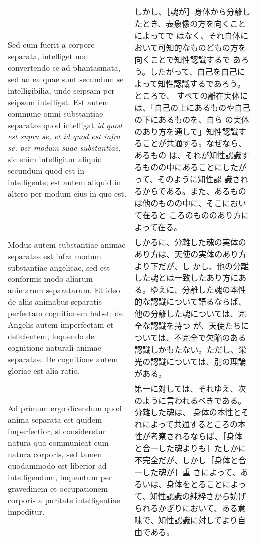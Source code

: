 \documentclass[10pt]{jsarticle} %
\begin{document}
\begin{longtable}{p{21em}p{21em}}
\\


Sed cum fuerit a corpore separata, intelliget non convertendo se ad
phantasmata, sed ad ea quae sunt secundum se intelligibilia, unde
seipsam per seipsam intelliget. Est autem commune omni substantiae
separatae quod intelligat {\it id quod est supra se, et id quod est
infra se, per modum suae substantiae}, sic enim intelligitur aliquid
secundum quod est in intelligente; est autem aliquid in altero per
modum eius in quo est.

&しかし、［魂が］身体から分離したとき、表象像の方を向くことによってで
はなく、それ自体において可知的なものどもの方を向くことで知性認識するで
あろう。したがって、自己を自己によって知性認識するであろう。ところで、
すべての離在実体には、「自己の上にあるものや自己の下にあるものを、自ら
の実体のあり方を通して」知性認識することが共通する。なぜなら、あるもの
は、それが知性認識するものの中にあることにしたがって、そのように知性認
識されるからである。また、あるものは他のものの中に、そこにおいて在ると
ころのもののあり方によって在る。
\\


Modus autem substantiae animae separatae est infra modum substantiae
angelicae, sed est conformis modo aliarum animarum separatarum. Et
ideo de aliis animabus separatis perfectam cognitionem habet; de
Angelis autem imperfectam et deficientem, loquendo de cognitione
naturali animae separatae. De cognitione autem gloriae est alia ratio.

&

しかるに、分離した魂の実体のあり方は、天使の実体のあり方より下だが、し
かし、他の分離した魂とは一致したあり方にある。ゆえに、分離した魂の本性
的な認識について語るならば、他の分離した魂については、完全な認識を持つ
が、天使たちについては、不完全で欠陥のある認識しかもたない。ただし、栄
光の認識については、別の理論がある。


\\



{\sc Ad primum ergo dicendum} quod anima separata est quidem
imperfectior, si consideretur natura qua communicat cum natura
corporis, sed tamen quodammodo est liberior ad intelligendum,
inquantum per gravedinem et occupationem corporis a puritate
intelligentiae impeditur.

&

第一に対しては、それゆえ、次のように言われるべきである。分離した魂は、
身体の本性とそれによって共通するところの本性が考察されるならば、［身体
と合一した魂よりも］たしかに不完全だが、しかし［身体と合一した魂が］重
さによって、あるいは、身体をとることによって、知性認識の純粋さから妨げ
られるかぎりにおいて、ある意味で、知性認識に対してより自由である。


\end{longtable}
\end{document}

